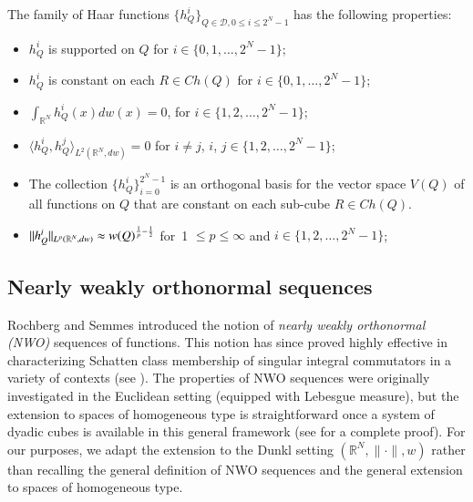 \documentclass[12pt]{amsart}
\begin{document}
\begin{lemma}
The family of Haar functions $\{h_{Q}^{i}\}_{Q\in\mathscr{D},0\leq i\leq 2^N-1}$ has the following properties:
    \begin{itemize}
\item[(i)] $h_{Q}^{i}$ is supported on $Q$ for $i\in\{0,1,\ldots,2^N-1\}$;
\item[(ii)] $h_{Q}^{i}$ is constant on each $R\in Ch(Q)$ for $i\in\{0,1,\ldots,2^N-1\}$;
\item[(iii)] $\int_{\mathbb{R}^N} h_{Q}^{i}(x)dw(x)= 0$, for $i\in\{1,2,\ldots,2^N-1\}$;
\item[(iv)] $\langle h_{Q}^{i},h_{Q}^{j}\rangle_{L^2(\mathbb{R}^N,dw)} = 0$ for
$i \neq j$, $i$, $j\in\{1, 2,\ldots, 2^N- 1\}$;
\item[(v)] The collection
$\{h_{Q}^{i}\}_{i = 0}^{2^N-1}$
is an orthogonal basis for the vector space $V(Q)$ of all functions on $Q$ that are constant on each sub-cube $R\in Ch(Q)$.
\item[(vi)]
            $
 \|h_{Q}^{i}\|_{L^p(\mathbb{R}^N,dw)}
    \approx w(Q)^{\frac{1}{p} - \frac{1}{2}}$
   \quad for~1 $\leq p \leq \infty$ and $i\in\{1,2,\ldots,2^N-1\}$;

    \end{itemize}
\end{lemma}


\subsection{Nearly weakly  orthonormal sequences}
Rochberg and Semmes \cite{RS} introduced the notion of \emph{nearly weakly  orthonormal (NWO)} sequences of functions. This notion has since proved highly effective in characterizing Schatten class membership of  singular integral commutators in a variety of contexts (see \cite{FLLXarxiv,HKarxiv,MR4756021,MR4552581,MR4873796,LLW,RS,Zhangwei1,Zhangwei2}). The properties of NWO sequences were originally investigated in the Euclidean setting (equipped with Lebesgue measure), but the extension to spaces of homogeneous type is straightforward once a system of dyadic cubes is available in this general framework (see \cite[Section 13]{HKarxiv} for a complete proof).  For our purposes, we adapt  the extension to the Dunkl setting $(\mathbb{R}^N,\|\cdot\|,w)$ rather than recalling the general  definition
of NWO sequences and the general extension to spaces of homogeneous type.
\end{document}
